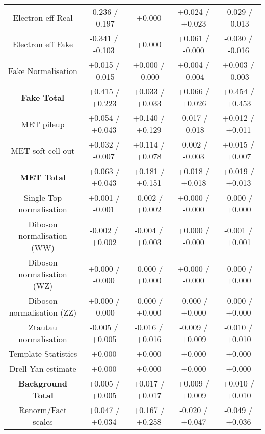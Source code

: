 \begin{table}[htbp]
\begin{center}
\begin{tabular}{|c|c|c|c|c|}
Electron eff Real                     &-0.236   / -0.197   & +0.000              & +0.024   / +0.023   & -0.029   / -0.013  \\
Electron eff Fake                     &-0.341   / -0.103   & +0.000              & +0.061   / -0.000   & -0.030   / -0.016  \\
Fake Normalisation                    &+0.015   / -0.015   & +0.000   / -0.000   & +0.004   / -0.004   & +0.003   / -0.003  \\
\hline
\textbf{Fake Total}                   &+0.415   / +0.223   & +0.033   / +0.033   & +0.066   / +0.026   & +0.454   / +0.453  \\
\hline
MET pileup                            &+0.054   / +0.043   & +0.140   / +0.129   & -0.017   / -0.018   & +0.012   / +0.011  \\
MET soft cell out                     &+0.032   / -0.007   & +0.114   / +0.078   & -0.002   / -0.003   & +0.015   / +0.007  \\
\hline
\textbf{MET Total}                    &+0.063   / +0.043   & +0.181   / +0.151   & +0.018   / +0.018   & +0.019   / +0.013  \\
\hline
Single Top normalisation              &+0.001   / -0.001   & -0.002   / +0.002   & +0.000   / -0.000   & -0.000   / +0.000  \\
Diboson normalisation (WW)            &-0.002   / +0.002   & -0.004   / +0.003   & +0.000   / -0.000   & -0.001   / +0.001  \\
Diboson normalisation (WZ)            &+0.000   / -0.000   & -0.000   / +0.000   & +0.000   / -0.000   & -0.000   / +0.000  \\
Diboson normalisation (ZZ)            &+0.000   / -0.000   & -0.000   / +0.000   & -0.000   / +0.000   & -0.000   / +0.000  \\
Ztautau normalisation                 &-0.005   / +0.005   & -0.016   / +0.016   & -0.009   / +0.009   & -0.010   / +0.010  \\
Template Statistics                   &+0.000              & +0.000              & +0.000              & +0.000             \\
Drell-Yan estimate                    &+0.000              & +0.000              & +0.000              & +0.000             \\
\hline
\textbf{Background Total}             &+0.005   / +0.005   & +0.017   / +0.017   & +0.009   / +0.009   & +0.010   / +0.010  \\
\hline
Renorm/Fact scales                    &+0.047   / +0.034   & +0.167   / +0.258   & -0.020   / +0.047   & -0.049   / +0.036  \\

\end{tabular}
\end{center}
\end{table}
